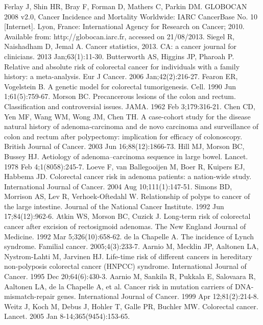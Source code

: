  
\renewcommand{\bibname}{References} 
\begin{thebibliography}{12} 
		Ferlay J, Shin HR, Bray F, Forman D, Mathers C, Parkin DM. GLOBOCAN 2008 v2.0, Cancer Incidence and Mortality Worldwide: IARC CancerBase No. 10 [Internet]. Lyon, France: International Agency for Research on Cancer; 2010. Available from: http://globocan.iarc.fr, accessed on 21/08/2013. 
		Siegel R, Naishadham D, Jemal A. Cancer statistics, 2013. CA: a cancer journal for clinicians. 2013 Jan;63(1):11-30. 
		Butterworth AS, Higgins JP, Pharoah P. Relative and absolute risk of colorectal cancer for individuals with a family history: a meta-analysis. Eur J Cancer. 2006 Jan;42(2):216-27. 
		Fearon ER, Vogelstein B. A genetic model for colorectal tumorigenesis. Cell. 1990 Jun 1;61(5):759-67. 
		Morson BC. Precancerous lesions of the colon and rectum. Classification and controversial issues. JAMA. 1962 Feb 3;179:316-21. 
		Chen CD, Yen MF, Wang WM, Wong JM, Chen TH. A case-cohort study for the disease natural history of adenoma-carcinoma and de novo carcinoma and surveillance of colon and rectum after polypectomy: implication for efficacy of colonoscopy. British Journal of Cancer. 2003 Jun 16;88(12):1866-73. 
		Hill MJ, Morson BC, Bussey HJ. Aetiology of adenoma--carcinoma sequence in large bowel. Lancet. 1978 Feb 4;1(8058):245-7. 
		Loeve F, van Ballegooijen M, Boer R, Kuipers EJ, Habbema JD. Colorectal cancer risk in adenoma patients: a nation-wide study. International Journal of Cancer. 2004 Aug 10;111(1):147-51. 
		Simons BD, Morrison AS, Lev R, Verhoek-Oftedahl W. Relationship of polyps to cancer of the large intestine. Journal of the National Cancer Institute. 1992 Jun 17;84(12):962-6. 
		Atkin WS, Morson BC, Cuzick J. Long-term risk of colorectal cancer after excision of rectosigmoid adenomas. The New England Journal of Medicine. 1992 Mar 5;326(10):658-62. 
		de la Chapelle A. The incidence of Lynch syndrome. Familial cancer. 2005;4(3):233-7. 
		Aarnio M, Mecklin JP, Aaltonen LA, Nystrom-Lahti M, Jarvinen HJ. Life-time risk of different cancers in hereditary non-polyposis colorectal cancer (HNPCC) syndrome. International Journal of Cancer. 1995 Dec 20;64(6):430-3. 
		Aarnio M, Sankila R, Pukkala E, Salovaara R, Aaltonen LA, de la Chapelle A, et al. Cancer risk in mutation carriers of DNA-mismatch-repair genes. International Journal of Cancer. 1999 Apr 12;81(2):214-8. 
		Weitz J, Koch M, Debus J, Hohler T, Galle PR, Buchler MW. Colorectal cancer. Lancet. 2005 Jan 8-14;365(9454):153-65. 

\end{thebibliography}
